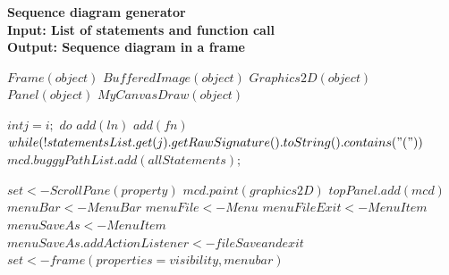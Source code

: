 \begin{algorithm}
	{\textbf{Sequence diagram generator}}\\	
	\noindent\makebox[\linewidth]{\rule{\textwidth}{0.4pt}}
	{\textbf{Input: List of statements and function call}} \\
	{\textbf{Output: Sequence diagram in a frame}}
	\begin{algorithmic}[1]
		
		    \State $ Frame (object)  $ 
			\State $ BufferedImage (object)  $ 
			\State $ Graphics2D(object) $
			\State $ Panel (object)$
			\State $ MyCanvasDraw(object )  $
					
					\State $int j=i;$
						\State $do$
						\State $add(ln)$ 
						\State $add(fn)$ 
						\State $while(!statementsList.get(j).getRawSignature().toString().contains("("))$
						\State $mcd.buggyPathList.add(allStatements);$ 
					\EndIf				
				\EndIf		
				
			\EndFor
				\State $set <- ScrollPane(property)$
				\State $mcd.paint(graphics2D)$ 
				\State $topPanel.add(mcd)$ 	
				\State $menuBar <- MenuBar$
				\State $menuFile <- Menu $
				\State $menuFileExit <- MenuItem$
				\State $menuSaveAs <- MenuItem $
				\State $menuSaveAs.addActionListener <- fileSave and exit$
				\State $set<-frame (properties=visibility,menubar)$
		
		\EndFunction		
		
	\end{algorithmic}
	\noindent\makebox[\linewidth]{\rule{\textwidth}{0.4pt}}
\end{algorithm}
